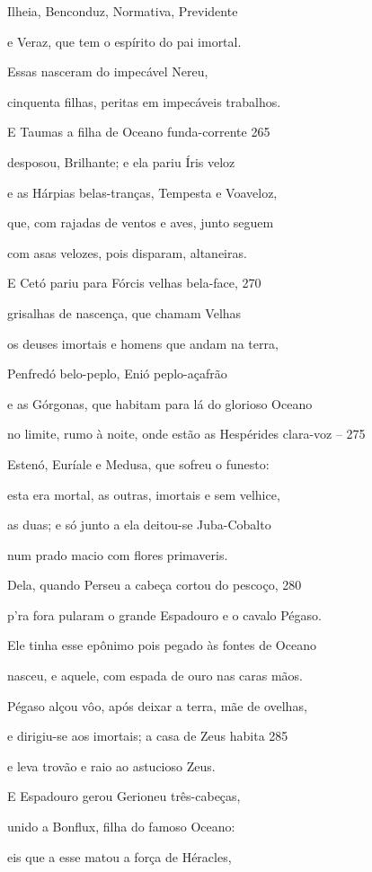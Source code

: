 Ilheia, Benconduz, Normativa, Previdente

e Veraz, que tem o espírito do pai imortal.

Essas nasceram do impecável Nereu,

cinquenta filhas, peritas em impecáveis trabalhos.

\quad{}E Taumas a filha de Oceano funda-corrente \num{265}

desposou, Brilhante; e ela pariu Íris veloz

e as Hárpias belas-tranças, Tempesta e Voaveloz,

que, com rajadas de ventos e aves, junto seguem

com asas velozes, pois disparam, altaneiras.

\medskip

E Cetó pariu para Fórcis velhas bela-face, \num{270}

grisalhas de nascença, que chamam Velhas

os deuses imortais e homens que andam na terra,

Penfredó belo-peplo, Enió peplo-açafrão

e as Górgonas, que habitam para lá do glorioso Oceano

no limite, rumo à noite, onde estão as Hespérides \qb{}clara-voz -- \num{275}

Estenó, Euríale e Medusa, que sofreu o funesto:

esta era mortal, as outras, imortais e sem velhice,

as duas; e só junto a ela deitou-se Juba-Cobalto

num prado macio com flores primaveris.

Dela, quando Perseu a cabeça cortou do pescoço, \num{280}

p'ra fora pularam o grande Espadouro e o cavalo Pégaso.

Ele tinha esse epônimo pois pegado às fontes de Oceano

nasceu, e aquele, com espada de ouro nas caras mãos.

Pégaso alçou vôo, após deixar a terra, mãe de ovelhas,

e dirigiu-se aos imortais; a casa de Zeus habita \num{285}

e leva trovão e raio ao astucioso Zeus.

E Espadouro gerou Gerioneu três-cabeças,

unido a Bonflux, filha do famoso Oceano:

eis que a esse matou a força de Héracles,

